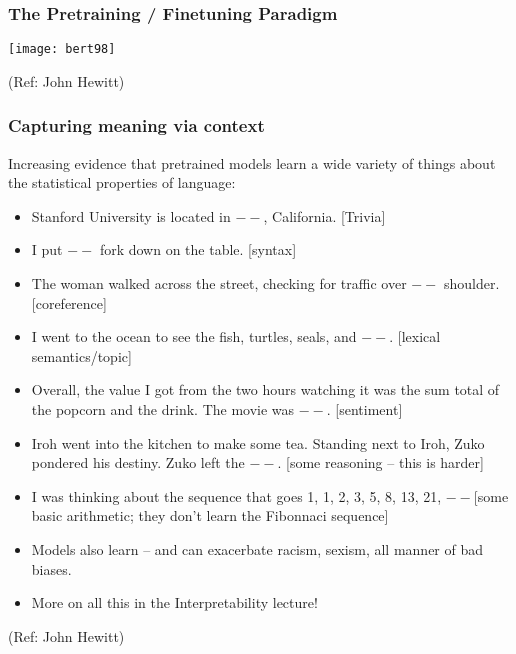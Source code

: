 \begin{frame}[fragile]\frametitle{The Pretraining / Finetuning Paradigm}

			
			\begin{center}
			\texttt{[image: bert98]}
			\end{center}		
			
			{\tiny (Ref: John Hewitt)}

\end{frame}

\begin{frame}[fragile]\frametitle{Capturing meaning via context}

Increasing evidence that pretrained models learn a wide variety of things about
the statistical properties of language:

      \begin{itemize}
			\item Stanford University is located in $--$, California. [Trivia]
			\item I put $--$ fork down on the table. [syntax]
			\item The woman walked across the street, checking for traffic over $--$ shoulder. [coreference]
			\item I went to the ocean to see the fish, turtles, seals, and $--$.	[lexical semantics/topic]
			\item Overall, the value I got from the two hours watching it was the sum total of the popcorn and the drink. The movie was $--$. [sentiment]
			\item Iroh went into the kitchen to make some tea. Standing next to Iroh, Zuko pondered his  destiny. Zuko left the $--$. [some reasoning – this is harder]
			\item I was thinking about the sequence that goes 1, 1, 2, 3, 5, 8, 13, 21, $--$[some basic arithmetic; they don’t learn the Fibonnaci sequence]
			\item Models also learn – and can exacerbate racism, sexism, all manner of bad biases.
			\item More on all this in the Interpretability lecture!

			\end{itemize}

			{\tiny (Ref: John Hewitt)}

\end{frame}

